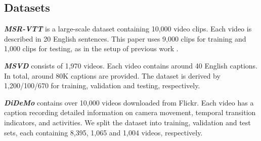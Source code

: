 \subsection{Datasets}
\noindent\textbf{\textit{MSR-VTT}} \cite{xu2016msr} is a large-scale dataset containing 10,000 video clips. Each video is described in 20 English sentences. This paper uses
9,000 clips for training and 1,000 clips for testing, as in the setup of previous work \cite{Liu2019UseWY}.

\noindent\textbf{\textit{MSVD}} \cite{chen2011collecting} consists of 1,970 videos. Each video contains around 40 English captions. In total, around 80K captions are provided. The dataset is derived by 1,200/100/670 for training, validation and testing, respectively. 



\noindent\textbf{\textit{DiDeMo}} \cite{anne2017localizing} contains over 10,000 videos downloaded from Flickr.
Each video has a caption recording detailed information on camera movement, temporal transition indicators, and activities. 
We split the dataset into training, validation and test sets, each containing 8,395, 1,065 and 1,004 videos, respectively.



